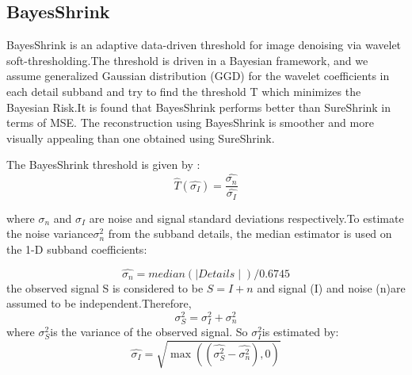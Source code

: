 \subsection{BayesShrink}
BayesShrink is an adaptive data-driven threshold for image denoising via wavelet soft-thresholding.The threshold is driven in a Bayesian framework, and we assume 
generalized Gaussian distribution (GGD) for the wavelet coefficients in each detail subband and try to find the threshold T which minimizes the Bayesian Risk.It is  found that BayesShrink performs better than SureShrink in terms of MSE. The reconstruction using BayesShrink is  smoother and more visually appealing than one obtained using SureShrink. 
\hfill \break

The BayesShrink threshold is given by :
\begin{equation}\label{bayest}
\hat{T}\left(\hat{{\sigma }_{I}} \right)=\frac{\hat{{\sigma }_{n}}}{\hat{{\sigma }_{I}}}
\end{equation}

where \({\sigma}_{n}\) and \({\sigma}_{I}\) are noise and signal standard deviations respectively.To estimate the noise variance\({\sigma}_{n}^{2}\) from the subband details, the median estimator is used on the 1-D subband coefficients:

\begin{equation}
\hat{{\sigma }_{n}}=median\left(\mid Details  \mid  \right)/0.6745
\end{equation}
the observed signal S is considered to be \( S=I+n\) and signal (I) and noise (n)are assumed to be independent.Therefore, 
\begin{equation}
\sigma _{S}^{2}=\sigma_{I}^{2}+\sigma_{n}^{2}
\end{equation}
where \(\sigma_{S}^{2} \)is the variance of the observed signal. So \(\sigma_{I}^{2}\)is estimated by:
\begin{equation}
\hat{\sigma_{I}}=\sqrt{\max\left(\left(\hat{{\sigma}_{S}^{2}}-\hat{\sigma _{n}^{2}} \right),0 \right)}
\end{equation}








